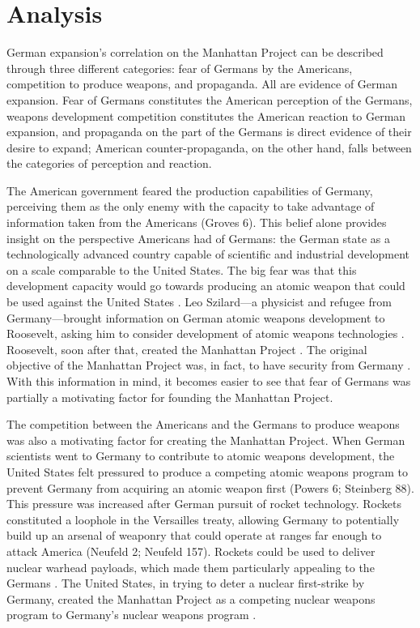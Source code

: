 \documentclass[a4paper,12pt]{article}
\begin{document}
    \section{Analysis}

        German expansion's correlation on the Manhattan Project can be described through three
        different categories: fear of Germans by the Americans, competition to produce weapons, and
        propaganda. All are evidence of German expansion. Fear of Germans constitutes the American
        perception of the Germans, weapons development competition constitutes the American reaction
        to German expansion, and propaganda on the part of the Germans is direct evidence of their
        desire to expand; American counter-propaganda, on the other hand, falls between the
        categories of perception and reaction.

        The American government feared the production capabilities of Germany, perceiving them as
        the only enemy with the capacity to take advantage of information taken from the Americans
        (Groves 6). This belief alone provides insight on the perspective Americans had of Germans:
        the German state as a technologically advanced country capable of scientific and industrial
        development on a scale comparable to the United States. The big fear was that this
        development capacity would go towards producing an atomic weapon that could be used against
        the United States \cite[136]{stoffm}. Leo Szilard---a physicist and refugee from Germany---brought
        information on German atomic weapons development to Roosevelt, asking him to consider
        development of atomic weapons technologies \cite[12]{norrism}. Roosevelt, soon after that, created
        the Manhattan Project \cite[12]{norrism}. The original objective of the Manhattan Project was, in
        fact, to have security from Germany \cite[140]{grovesl}. With this information in mind, it becomes
        easier to see that fear of Germans was partially a motivating factor for founding the
        Manhattan Project.

        The competition between the Americans and the Germans to produce weapons was also a
        motivating factor for creating the Manhattan Project. When German scientists went to Germany
        to contribute to atomic weapons development, the United States felt pressured to produce a
        competing atomic weapons program to prevent Germany from acquiring an atomic weapon first
        (Powers 6; Steinberg 88). This pressure was increased after German pursuit of rocket
        technology. Rockets constituted a loophole in the Versailles treaty, allowing Germany to
        potentially build up an arsenal of weaponry that could operate at ranges far enough to
        attack America (Neufeld 2; Neufeld 157). Rockets could be used to deliver nuclear warhead
        payloads, which made them particularly appealing to the Germans \cite[157]{neufeldm}. The United
        States, in trying to deter a nuclear first-strike by Germany, created the Manhattan Project
        as a competing nuclear weapons program to Germany's nuclear weapons program \cite[89]{steinbergg}.
\end{document}
